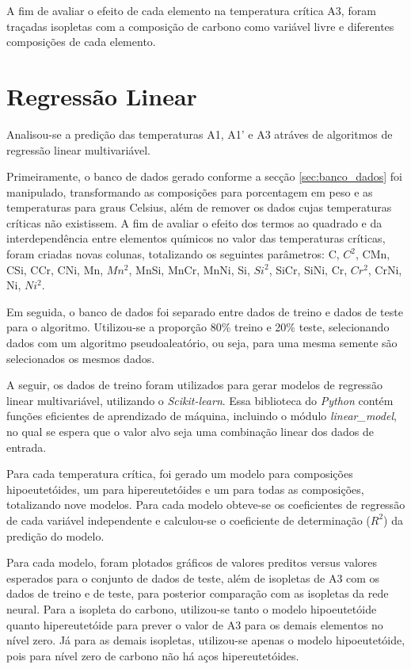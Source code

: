 \documentclass[brazil,tf,epusp]{usp}  %
\begin{document}
A fim de avaliar o efeito de cada elemento na temperatura crítica A3, foram traçadas isopletas com a composição de carbono como variável livre e diferentes composições de cada elemento.

\section{Regressão Linear}
\label{sec:metodo_RL}

Analisou-se a predição das temperaturas A1, A1' e A3 atráves de algoritmos de regressão linear multivariável.

Primeiramente, o banco de dados gerado conforme a secção \ref{sec:banco_dados} foi manipulado, transformando as composições para porcentagem em peso e as temperaturas para graus Celsius, além de remover os dados cujas temperaturas críticas não existissem. A fim de avaliar o efeito dos termos ao quadrado e da interdependência entre elementos químicos no valor das temperaturas críticas, foram criadas novas colunas, totalizando os seguintes parâmetros: C, $C^{2}$, CMn, CSi, CCr, CNi, Mn, $Mn^{2}$, MnSi, MnCr, MnNi, Si, $Si^{2}$, SiCr, SiNi, Cr, $Cr^{2}$, CrNi, Ni, $Ni^{2}$.

Em seguida, o banco de dados foi separado entre dados de treino e dados de teste para o algoritmo. Utilizou-se a proporção 80\% treino e 20\% teste, selecionando dados com um algoritmo pseudoaleatório, ou seja, para uma mesma semente são selecionados os mesmos dados.

A seguir, os dados de treino foram utilizados para gerar modelos de regressão linear multivariável, utilizando o \textit{Scikit-learn}. Essa biblioteca do \textit{Python} contém funções eficientes de aprendizado de máquina, incluindo o módulo \textit{linear\_model}, no qual se espera que o valor alvo seja uma combinação linear dos dados de entrada.

Para cada temperatura crítica, foi gerado um modelo para composições hipoeutetóides, um para hipereutetóides e um para todas as composições, totalizando nove modelos. Para cada modelo obteve-se os coeficientes de regressão de cada variável independente e calculou-se o coeficiente de determinação ($R^{2}$) da predição do modelo.

Para cada modelo, foram plotados gráficos de valores preditos versus valores esperados para o conjunto de dados de teste, além de isopletas de A3 com os dados de treino e de teste, para posterior comparação com as isopletas da rede neural. Para a isopleta do carbono, utilizou-se tanto o modelo hipoeutetóide quanto hipereutetóide para prever o valor de A3 para os demais elementos no nível zero. Já para as demais isopletas, utilizou-se apenas o modelo hipoeutetóide, pois para nível zero de carbono não há aços hipereutetóides.
\end{document}
